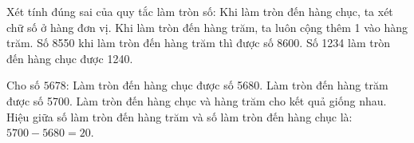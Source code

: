 \begin{ex} %
Xét tính đúng sai của quy tắc làm tròn số:
\choiceTF
{\True Khi làm tròn đến hàng chục, ta xét chữ số ở hàng đơn vị.}
{Khi làm tròn đến hàng trăm, ta luôn cộng thêm 1 vào hàng trăm.}
{\True Số 8550 khi làm tròn đến hàng trăm thì được số 8600.}
{Số 1234 làm tròn đến hàng chục được 1240.}
\end{ex}

\begin{ex} %
Cho số $5678$:
\choiceTF
{\True Làm tròn đến hàng chục được số 5680.}
{\True Làm tròn đến hàng trăm được số 5700.}
{Làm tròn đến hàng chục và hàng trăm cho kết quả giống nhau.}
{\True Hiệu giữa số làm tròn đến hàng trăm và số làm tròn đến hàng chục là: $5700 - 5680 = 20$.}
\end{ex}

